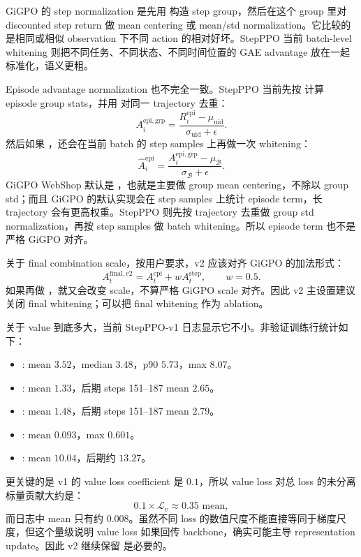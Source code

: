 \documentclass[10pt]{ctexart}
\begin{document}
GiGPO 的 step normalization 是先用  构造 step group，然后在这个 group 里对 discounted step return 做 mean centering 或 mean/std normalization。它比较的是相同或相似 observation 下不同 action 的相对好坏。StepPPO 当前 batch-level whitening 则把不同任务、不同状态、不同时间位置的 GAE advantage 放在一起标准化，语义更粗。

Episode advantage normalization 也不完全一致。StepPPO 当前先按  计算 episode group stats，并用  对同一 trajectory 去重：
\[
A_i^{\mathrm{epi,grp}}
=
\frac{R_i^{\mathrm{epi}}-\mu_{\mathrm{uid}}}{\sigma_{\mathrm{uid}}+\epsilon}.
\]
然后如果 ，还会在当前 batch 的 step samples 上再做一次 whitening：
\[
\widehat A_i^{\mathrm{epi}}
=
\frac{A_i^{\mathrm{epi,grp}}-\mu_{\mathcal B}}{\sigma_{\mathcal B}+\epsilon}.
\]
GiGPO WebShop 默认是 ，也就是主要做 group mean centering，不除以 group std；而且 GiGPO 的默认实现会在 step samples 上统计 episode term，长 trajectory 会有更高权重。StepPPO 则先按 trajectory 去重做 group std normalization，再按 step samples 做 batch whitening。所以 episode term 也不是严格 GiGPO 对齐。

关于 final combination scale，按用户要求，v2 应该对齐 GiGPO 的加法形式：
\[
A_t^{\mathrm{final},v2}
=
A_t^{\mathrm{epi}} + w A_t^{\mathrm{step}},
\qquad w=0.5.
\]
如果再做 ，就又会改变 scale，不算严格 GiGPO scale 对齐。因此 v2 主设置建议关闭 final whitening；可以把 final whitening 作为 ablation。

关于 value 到底多大，当前 StepPPO-v1 日志显示它不小。非验证训练行统计如下：
\begin{itemize}
\item {}: mean $3.52$，median $3.48$，p90 $5.73$，max $8.07$。
\item {}: mean $1.33$，后期 steps 151--187 mean $2.65$。
\item {}: mean $1.48$，后期 steps 151--187 mean $2.79$。
\item {}: mean $0.093$，max $0.601$。
\item {}: mean $10.04$，后期约 $13.27$。
\end{itemize}

更关键的是 v1 的 value loss coefficient 是 $0.1$，所以 value loss 对总 loss 的未分离标量贡献大约是：
\[
0.1\times \mathcal L_v
\approx 0.35 \text{ mean},
\]
而日志中  mean 只有约 $0.008$。虽然不同 loss 的数值尺度不能直接等同于梯度尺度，但这个量级说明 value loss 如果回传 backbone，确实可能主导 representation update。因此 v2 继续保留  是必要的。
\end{document}
